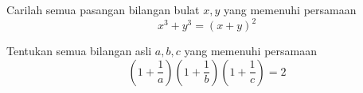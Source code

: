 \documentclass[11pt]{scrartcl}
\begin{document}


    \begin{problem}
        Carilah semua pasangan bilangan bulat $x, y$ yang memenuhi persamaan \[x^3 + y^3 = (x + y)^2\]
    \end{problem}



    \begin{problem}
        Tentukan semua bilangan asli $a, b, c$ yang memenuhi persamaan \[\left(1 + \dfrac{1}{a}\right)\left(1 + \dfrac{1}{b}\right)\left(1 + \dfrac{1}{c}\right) = 2\]
    \end{problem}

\end{document}
